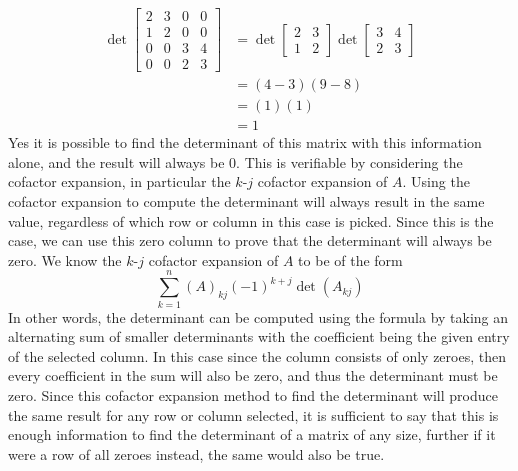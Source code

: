 \documentclass{report}
\begin{document}
$$
\begin{aligned}
\operatorname{det}
\begin{bmatrix}
2 & 3 & 0 & 0 \\
1 & 2 & 0 & 0 \\
0 & 0 & 3 & 4 \\
0 & 0 & 2 & 3
\end{bmatrix} & =
\operatorname{det}\begin{bmatrix} 2 & 3 \\ 1 & 2 \end{bmatrix}\operatorname{det}\begin{bmatrix} 3 & 4 \\ 2 & 3 \end{bmatrix} \\
& = (4 - 3)(9-8) \\
& = (1)(1) \\
& = 1
\end{aligned}
$$
\sol Yes it is possible to find the determinant of this matrix with this information alone, and the result will always be 0. This is verifiable by considering the cofactor expansion, in particular the $k$-$j$ cofactor expansion of $A$. Using the cofactor expansion to compute the determinant will always result in the same value, regardless of which row or column in this case is picked. Since this is the case, we can use this zero column to prove that the determinant will always be zero. We know the $k$-$j$ cofactor expansion of $A$ to be of the form
$$
\sum_{k=1}^n (A)_{kj}(-1)^{k+j}\operatorname{det}(A_{kj})
$$
In other words, the determinant can be computed using the formula by taking an alternating sum of smaller determinants with the coefficient being the given entry of the selected column. In this case since the column consists of only zeroes, then every coefficient in the sum will also be zero, and thus the determinant must be zero. Since this cofactor expansion method to find the determinant will produce the same result for any row or column selected, it is sufficient to say that this is enough information to find the determinant of a matrix of any size, further if it were a row of all zeroes instead, the same would also be true.
\end{document}
